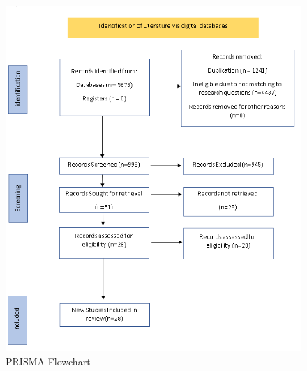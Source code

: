 \documentclass[twocolumn,12pt,a4paper]{article}
\begin{document}
\begin{figure}[p]
  \centering
  \includegraphics[width=\textwidth,keepaspectratio]{PRISMASummary.png}
  \caption{PRISMA Flowchart}\label{fig:prisma}
\end{figure}
\end{document}
